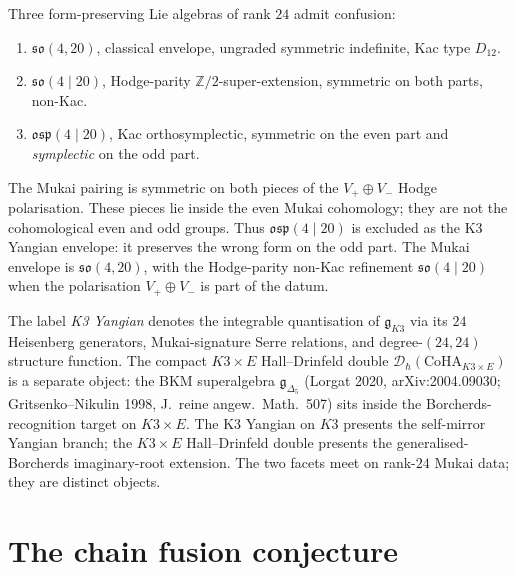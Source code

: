\begin{remark}
\label{rem:bulk-k3-yangian-trichotomy}
Three form-preserving Lie algebras of rank $24$ admit confusion:
\begin{enumerate}[label=\textup{(\alph*)},leftmargin=1.6em,itemsep=1pt]
\item $\mathfrak{so}(4, 20)$, classical envelope, ungraded
symmetric indefinite, Kac type $D_{12}$.
\item $\mathfrak{so}(4 \mid 20)$, Hodge-parity
$\mathbb Z/2$-super-extension, symmetric on both parts, non-Kac.
\item $\mathfrak{osp}(4 \mid 20)$, Kac orthosymplectic, symmetric on
the even part and \emph{symplectic} on the odd part.
\end{enumerate}
The Mukai pairing is symmetric on both pieces of the
$V_+\oplus V_-$ Hodge polarisation. These pieces lie inside the even
Mukai cohomology; they are not the cohomological even and odd groups.
Thus $\mathfrak{osp}(4 \mid 20)$ is excluded as the K3 Yangian envelope:
it preserves the wrong form on the odd part. The Mukai envelope is
$\mathfrak{so}(4,20)$, with the Hodge-parity non-Kac refinement
$\mathfrak{so}(4\mid20)$ when the polarisation \(V_+\oplus V_-\) is part
of the datum.
\end{remark}

\begin{remark}
\label{rem:bulk-k3-yangian-vs-hall-drinfeld}
The label \emph{K3 Yangian} denotes the integrable quantisation of
$\mathfrak{g}_{K3}$ via its $24$ Heisenberg generators,
Mukai-signature Serre relations, and degree-$(24,24)$ structure
function. The compact $K3 \times E$ Hall--Drinfeld double
$\mathcal D_{\hbar}(\mathrm{CoHA}_{K3 \times E})$ is a separate object:
the BKM superalgebra $\mathfrak{g}_{\Delta_{5}}$ (Lorgat 2020,
arXiv:2004.09030; Gritsenko--Nikulin 1998, J.\ reine angew.\ Math.\
507) sits inside the Borcherds-recognition target on $K3 \times E$.
The K3 Yangian on $K3$ presents the self-mirror Yangian branch; the
$K3 \times E$ Hall--Drinfeld double presents the
generalised-Borcherds imaginary-root extension. The two facets meet
on rank-$24$ Mukai data; they are distinct objects.
\end{remark}

\section{The chain fusion conjecture}
\label{sec:bulk-chain-fusion}

